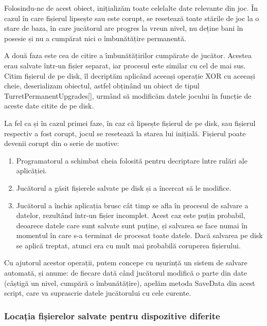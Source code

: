 \documentclass[12pt, a4paper]{article}
\begin{document}
	Folosindu-ne de acest obiect, inițializăm toate celelalte date relevante din joc. În cazul în care fișierul lipsește sau este corupt, se resetează toate stările de joc la o stare de baza, în care jucătorul are progres la vreun nivel, nu deține bani în posesie și nu a cumpărat nici o îmbunătățire permanentă.
	\newline
	
	A două faza este cea de citire a îmbunătățirilor cumpărate de jucător. Acestea erau salvate într-un fișier separat, iar procesul este similar cu cel de mai sus. Citim fișierul de pe disk, îl decriptăm aplicând aceeași operație XOR cu aceeași cheie, deserializam obiectul, astfel obținând un obiect de tipul TurretPermanentUpgrades[], urmând să modificăm datele jocului în funcție de aceste date citite de pe disk.
	\newline
	
	La fel ca și în cazul primei faze, în caz că lipsește fișierul de pe disk, sau fișierul respectiv a fost corupt, jocul se resetează la starea lui inițială. Fișierul poate devenii corupt din o serie de motive:
	
	\begin{enumerate}
		\item Programatorul a schimbat cheia folosită pentru decriptare între rulări ale aplicăției.
		\item Jucătorul a găsit fișierele salvate pe disk și a încercat să le modifice.
		\item Jucătorul a închis aplicația brusc cât timp se afla în procesul de salvare a datelor, rezultând într-un fișier incomplet. Acest caz este puțin probabil, deoarece datele care sunt salvate sunt puține, și salvarea se face numai în momentul în care s-a terminat de procesat toate datele. Dacă salvarea pe disk se aplică treptat, atunci era cu mult mai probabilă coruperea fișierului.
	\end{enumerate}
	
	Cu ajutorul acestor operații, putem concepe cu ușurință un sistem de salvare automată, și anume: de fiecare dată când jucătorul modifică o parte din date (câștigă un nivel, cumpără o îmbunătățire), apelăm metoda SaveData din acest script, care va suprascrie datele jucătorului cu cele curente.
	
	
	
	
	\subsubsection{Locația fișierelor salvate pentru dispozitive diferite}
	\label{section: androidSave}
	
\end{document}
